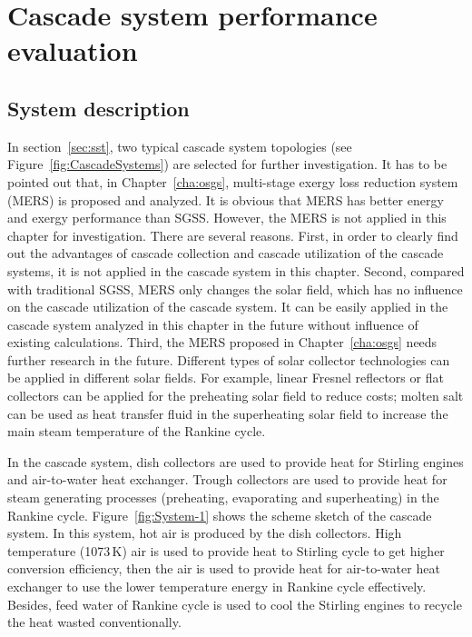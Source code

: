 \chapter{Cascade system performance evaluation}
\section{System description}

In section~\ref{sec:sst}, two typical cascade system topologies (see Figure~\ref{fig:CascadeSystems}) are selected for further investigation. It has to be pointed out that, in Chapter~\ref{cha:osgs}, multi-stage exergy loss reduction system (MERS) is proposed and analyzed. It is obvious that MERS has better energy and exergy performance than SGSS. However, the MERS is not applied in this chapter for investigation. There are several reasons. First,
in order to clearly find out the advantages of cascade collection and cascade utilization of the cascade systems, it is not applied in the cascade system in this chapter. Second, compared with traditional SGSS, MERS only changes the solar field, which has no influence on the cascade utilization of the cascade system. It can be easily applied in the cascade system analyzed in this chapter in the future without influence of existing calculations. Third, the MERS proposed in Chapter~\ref{cha:osgs} needs further research in the future. Different types of solar collector technologies can be applied in different solar fields. For example, linear Fresnel reflectors or flat collectors can be applied for the preheating solar field to reduce costs; molten salt can be used as heat transfer fluid in the superheating solar field to increase the main steam temperature of the Rankine cycle.

In the cascade system, dish collectors are used to provide heat for Stirling engines and air-to-water heat exchanger. Trough collectors are used to provide heat for steam generating processes (preheating, evaporating and superheating) in the Rankine cycle. Figure~\ref{fig:System-1} shows the scheme sketch of the cascade system. In this system, hot air is produced by the dish collectors. High temperature (1073\,K) air is used to provide heat to Stirling cycle to get higher conversion efficiency, then the air is used to provide heat for air-to-water heat exchanger to use the lower temperature energy in Rankine cycle effectively. Besides, feed water of Rankine cycle is used to cool the Stirling engines to recycle the heat wasted conventionally. 

